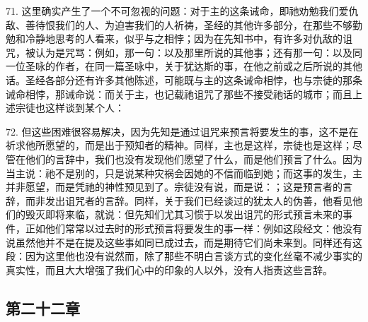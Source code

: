 71. 这里确实产生了一个不可忽视的问题：对于主的这条诫命，即祂劝勉我们爱仇敌、善待恨我们的人、为迫害我们的人祈祷，圣经的其他许多部分，在那些不够勤勉和冷静地思考的人看来，似乎与之相悖；因为在先知书中，有许多对仇敌的诅咒，被认为是咒骂：例如，那一句：以及那里所说的其他事；还有那一句：以及同一位圣咏的作者，在同一篇圣咏中，关于犹达斯的事，在他之前或之后所说的其他话。圣经各部分还有许多其他陈述，可能既与主的这条诫命相悖，也与宗徒的那条诫命相悖，那诫命说：而关于主，也记载祂诅咒了那些不接受祂话的城市；而且上述宗徒也这样谈到某个人：\par

72. 但这些困难很容易解决，因为先知是通过诅咒来预言将要发生的事，这不是在祈求他所愿望的，而是出于预知者的精神。同样，主也是这样，宗徒也是这样；尽管在他们的言辞中，我们也没有发现他们愿望了什么，而是他们预言了什么。因为当主说：祂不是别的，只是说某种灾祸会因她的不信而临到她；而这事的发生，主并非愿望，而是凭祂的神性预见到了。宗徒没有说，而是说：；这是预言者的言辞，而非发出诅咒者的言辞。同样，关于我们已经谈过的犹太人的伪善，他看见他们的毁灭即将来临，就说：但先知们尤其习惯于以发出诅咒的形式预言未来的事件，正如他们常常以过去时的形式预言将要发生的事一样：例如这段经文：他没有说虽然他并不是在提及这些事如同已成过去，而是期待它们尚未来到。同样还有这段：因为这里他也没有说然而，除了那些不明白言谈方式的变化丝毫不减少事实的真实性，而且大大增强了我们心中的印象的人以外，没有人指责这些言辞。\par


\subsection{第二十二章}

